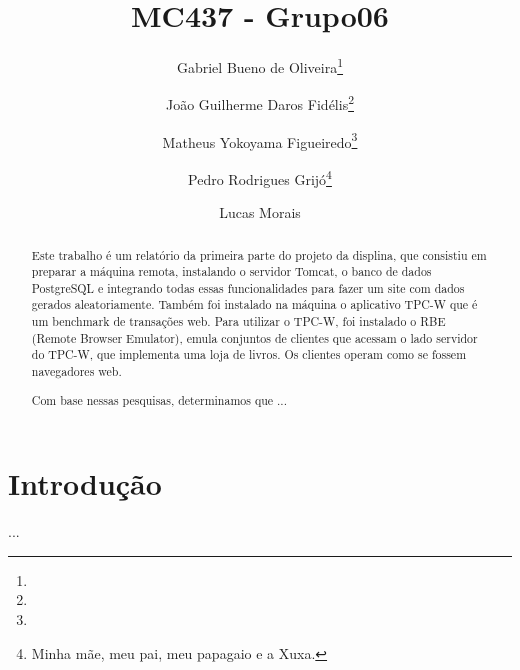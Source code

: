 \documentclass[11pt,twoside]{article}
\begin{document}
% 

%



\TRMakeCover


%
\pagestyle{myheadings}

%
\title{MC437 - Grupo06}

\author{Gabriel Bueno de Oliveira\thanks{} \and
Jo{\~a}o Guilherme Daros Fid{\'e}lis\thanks{} \and
Matheus Yokoyama Figueiredo\thanks{} \and Pedro Rodrigues Grij{\'o}\thanks{Minha m{\~a}e, meu pai, meu papagaio e a Xuxa.} \and Lucas Morais}

\date{}

\maketitle


\begin{abstract} 
  Este trabalho é um relatório da primeira parte do projeto da displina, que consistiu em preparar a máquina remota, instalando o servidor Tomcat, o banco de dados PostgreSQL e integrando todas essas funcionalidades para fazer um site com dados gerados aleatoriamente. Também foi instalado na máquina o aplicativo TPC-W que é um benchmark de transações web. Para utilizar o TPC-W, foi instalado o RBE (Remote Browser Emulator), emula conjuntos de clientes que acessam o lado servidor do TPC-W, que implementa uma loja de livros. Os clientes operam como se fossem navegadores web.

  Com base nessas pesquisas, determinamos que ...
\end{abstract}

\section{Introdução}

 ...
\end{document}
